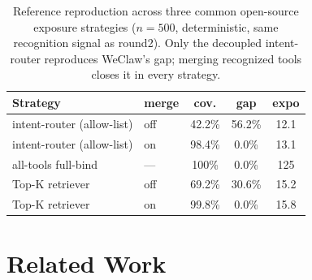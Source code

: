 \begin{table}[t]
\caption{Reference reproduction across three common open-source exposure strategies ($n=500$, deterministic, same recognition signal as round2). Only the decoupled intent-router reproduces WeClaw's gap; merging recognized tools closes it in every strategy.}
\label{tab:ossfw}
\begin{center}
\footnotesize
\begin{tabular}{llccc}
\toprule
\textbf{Strategy} & \textbf{merge} & \textbf{cov.} & \textbf{gap} & \textbf{expo} \\
\midrule
intent-router (allow-list) & off & 42.2\% & 56.2\% & 12.1 \\
intent-router (allow-list) & on & 98.4\% & 0.0\% & 13.1 \\
all-tools full-bind & --- & 100\% & 0.0\% & 125 \\
Top-K retriever & off & 69.2\% & 30.6\% & 15.2 \\
Top-K retriever & on & 99.8\% & 0.0\% & 15.8 \\
\bottomrule
\end{tabular}
\end{center}
\end{table}

\section{Related Work}
\label{sec:related}

